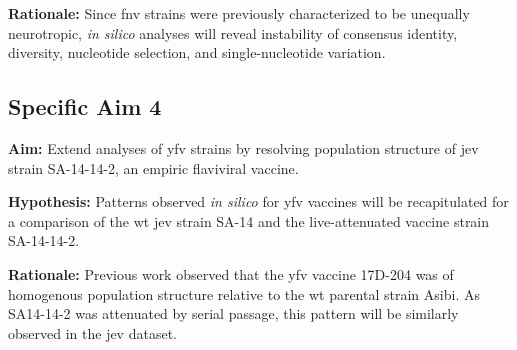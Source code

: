 \textbf{Rationale:} Since \gls{fnv} strains were previously characterized to be unequally neurotropic, \emph{in silico} analyses will reveal instability of consensus identity, diversity, nucleotide selection, and single-nucleotide variation.

\subsection{Specific Aim 4} 
\textbf{Aim:} Extend analyses of \gls{yfv} strains by resolving population structure of \gls{jev} strain SA-14-14-2, an empiric flaviviral vaccine.

\textbf{Hypothesis:} Patterns observed \emph{in silico} for \gls{yfv} vaccines will be recapitulated for a comparison of the \gls{wt} \gls{jev} strain SA-14 and the live-attenuated vaccine strain SA-14-14-2.

\textbf{Rationale:} Previous work observed that the \gls{yfv} vaccine 17D-204 was of homogenous population structure relative to the \gls{wt} parental strain Asibi. As SA14-14-2 was attenuated by serial passage, this pattern will be similarly observed in the \gls{jev} dataset.


\clearpage
\begin{table}[h]
	\centering
	\caption[Amino acid substitutions contained in the WHO standard genotype for YFV vaccines.]
	{Amino acid substitutions contained in the WHO standard genotype for YFV vaccines.}
	\begin{ThreePartTable}
		
		\begin{tablenotes}
			\item[]
		\end{tablenotes}
	\end{ThreePartTable}
	\label{WHO_standard_YFV}
\end{table}

\clearpage
\begin{ThreePartTable}
	\tabulinesep=1.2mm
	\taburowcolors [3] 2{gray!20 .. white}
	
			\begin{tablenotes}
				\item[a] \parencite{Minor:2011hk}
				\item[b] \parencite{Lang:1999wi}
				\item[c] \parencite{BelmustoWorn:2005tt}
				\item[d] \parencite{Camacho:2004ui,Camacho:2005vb}
				\item[e] \parencite{Pfister:2005tm}
				\item[f] \parencite{Ripoll:2014fz}
			\end{tablenotes}
\end{ThreePartTable}


